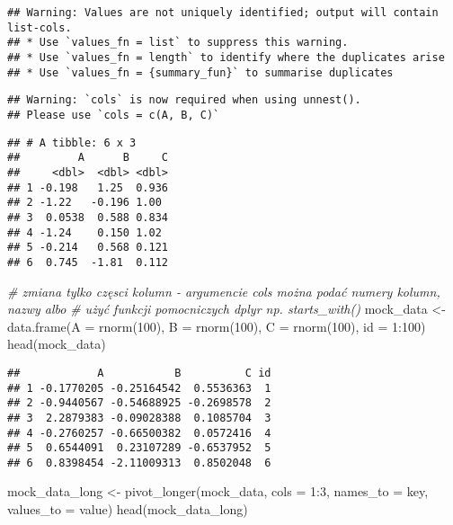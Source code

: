 \documentclass[
]{book}
\newenvironment{Shaded}{\begin{snugshade}}{\end{snugshade}}
\newcommand{\AttributeTok}[1]{\textcolor[rgb]{0.77,0.63,0.00}{#1}}
\newcommand{\CommentTok}[1]{\textcolor[rgb]{0.56,0.35,0.01}{\textit{#1}}}
\newcommand{\DecValTok}[1]{\textcolor[rgb]{0.00,0.00,0.81}{#1}}
\newcommand{\FunctionTok}[1]{\textcolor[rgb]{0.00,0.00,0.00}{#1}}
\newcommand{\NormalTok}[1]{#1}
\newcommand{\OtherTok}[1]{\textcolor[rgb]{0.56,0.35,0.01}{#1}}
\newcommand{\SpecialCharTok}[1]{\textcolor[rgb]{0.00,0.00,0.00}{#1}}
\newcommand{\StringTok}[1]{\textcolor[rgb]{0.31,0.60,0.02}{#1}}
\begin{document}
\begin{verbatim}
## Warning: Values are not uniquely identified; output will contain list-cols.
## * Use `values_fn = list` to suppress this warning.
## * Use `values_fn = length` to identify where the duplicates arise
## * Use `values_fn = {summary_fun}` to summarise duplicates
\end{verbatim}

\begin{verbatim}
## Warning: `cols` is now required when using unnest().
## Please use `cols = c(A, B, C)`
\end{verbatim}

\begin{verbatim}
## # A tibble: 6 x 3
##         A      B     C
##     <dbl>  <dbl> <dbl>
## 1 -0.198   1.25  0.936
## 2 -1.22   -0.196 1.00 
## 3  0.0538  0.588 0.834
## 4 -1.24    0.150 1.02 
## 5 -0.214   0.568 0.121
## 6  0.745  -1.81  0.112
\end{verbatim}

\begin{Shaded}
\begin{Highlighting}[]
\CommentTok{\# zmiana tylko częsci kolumn {-} argumencie cols można podać numery kolumn, nazwy albo }
\CommentTok{\# użyć funkcji pomocniczych dplyr np. starts\_with()}
\NormalTok{mock\_data }\OtherTok{\textless{}{-}} \FunctionTok{data.frame}\NormalTok{(}\AttributeTok{A =} \FunctionTok{rnorm}\NormalTok{(}\DecValTok{100}\NormalTok{), }\AttributeTok{B =} \FunctionTok{rnorm}\NormalTok{(}\DecValTok{100}\NormalTok{), }\AttributeTok{C =} \FunctionTok{rnorm}\NormalTok{(}\DecValTok{100}\NormalTok{), }\AttributeTok{id =} \DecValTok{1}\SpecialCharTok{:}\DecValTok{100}\NormalTok{)}
\FunctionTok{head}\NormalTok{(mock\_data)}
\end{Highlighting}
\end{Shaded}

\begin{verbatim}
##            A           B          C id
## 1 -0.1770205 -0.25164542  0.5536363  1
## 2 -0.9440567 -0.54688925 -0.2698578  2
## 3  2.2879383 -0.09028388  0.1085704  3
## 4 -0.2760257 -0.66500382  0.0572416  4
## 5  0.6544091  0.23107289 -0.6537952  5
## 6  0.8398454 -2.11009313  0.8502048  6
\end{verbatim}

\begin{Shaded}
\begin{Highlighting}[]
\NormalTok{mock\_data\_long }\OtherTok{\textless{}{-}} \FunctionTok{pivot\_longer}\NormalTok{(mock\_data, }\AttributeTok{cols =} \DecValTok{1}\SpecialCharTok{:}\DecValTok{3}\NormalTok{, }\AttributeTok{names\_to =} \StringTok{\textquotesingle{}key\textquotesingle{}}\NormalTok{, }\AttributeTok{values\_to =} \StringTok{\textquotesingle{}value\textquotesingle{}}\NormalTok{)}
\FunctionTok{head}\NormalTok{(mock\_data\_long)}
\end{Highlighting}
\end{Shaded}
\end{document}
